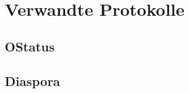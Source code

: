 
\chapter{Verwandte Protokolle}
	\section{OStatus}
	\label{sub:ostatus}
	\section{Diaspora}
	\label{sub:diaspora}